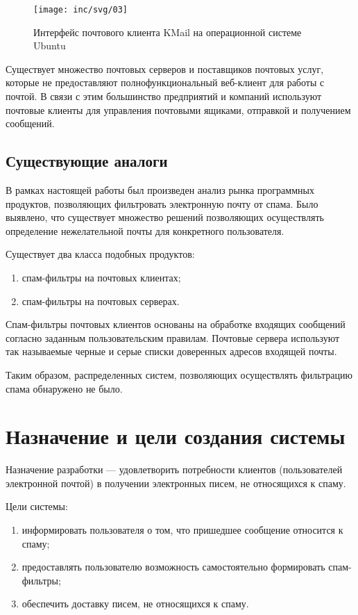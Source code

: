 \begin{figure}
  \centering
  \texttt{[image: inc/svg/03]}
  \caption{Интерфейс почтового клиента KMail на операционной системе Ubuntu}
  \label{fig:fig03}
\end{figure}

Существует множество почтовых серверов и поставщиков почтовых услуг, которые не предоставляют полнофункциональный веб-клиент  для работы  с почтой. В связи с этим большинство предприятий и компаний используют почтовые клиенты для управления почтовыми ящиками, отправкой и получением сообщений.


\subsection{Существующие аналоги}
В рамках настоящей работы был произведен анализ рынка программных продуктов, позволяющих фильтровать электронную почту от спама. Было выявлено, что существует множество решений позволяющих осуществлять определение нежелательной почты для конкретного пользователя. 

Существует два класса подобных продуктов:
\begin{enumerate}
	\item спам-фильтры на почтовых клиентах;
	\item спам-фильтры на почтовых серверах. 
\end{enumerate}

Спам-фильтры почтовых клиентов основаны на обработке входящих сообщений согласно заданным пользовательским правилам.  Почтовые сервера используют так называемые черные и серые списки доверенных адресов входящей почты.

Таким образом, распределенных систем, позволяющих осуществлять фильтрацию спама обнаружено не было.


\section{Назначение и цели создания системы}
Назначение разработки --- удовлетворить потребности клиентов (пользователей электронной почтой) в получении электронных писем, не относящихся к спаму.

Цели системы:
\begin{enumerate}
	\item информировать пользователя о том, что пришедшее сообщение относится к спаму;
	\item предоставлять пользователю возможность самостоятельно формировать спам-фильтры;
	\item обеспечить доставку писем, не относящихся к спаму.
\end{enumerate}

